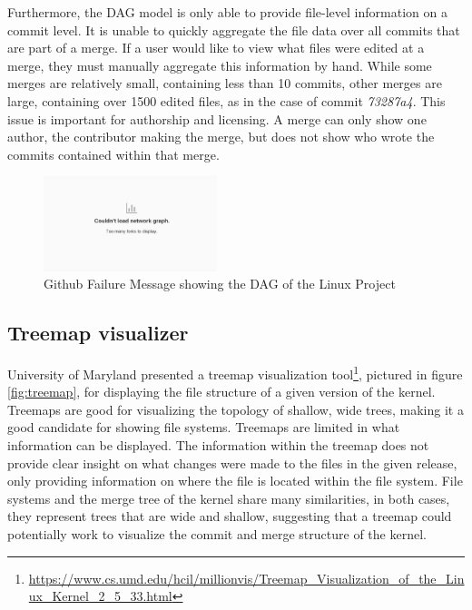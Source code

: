 \documentclass[conference, draftclsnofoot]{IEEEtran}
\begin{document}
Furthermore, the DAG model is only able to provide file-level information on a
commit level. It is unable to quickly aggregate the file data over all commits that
are part of a merge. If a user would like to view what files were edited at a merge,
they must manually aggregate this information by hand. While some merges are
relatively small, containing less than 10 commits, other merges are large,
containing over 1500 edited files, as in the case of commit \textit{73287a4}. This
issue is important for authorship and licensing. A merge can only show one author,
the contributor making the merge, but does not show who wrote the commits contained
within that merge.

\begin{figure}
        \centering
        \includegraphics[width=0.45\textwidth]{figures/github_viewer.png}
        \caption{Github Failure Message showing the DAG of the Linux Project}
        \label{fig:gitfail}
\end{figure}


\subsection{Treemap visualizer}

University of Maryland presented a treemap visualization
tool\footnote{\url{https://www.cs.umd.edu/hcil/millionvis/Treemap_Visualization_of_the_Linux_Kernel_2_5_33.html}},
pictured in figure \ref{fig:treemap}, for
displaying the file structure of a given version of the kernel. Treemaps are good
for visualizing the topology of shallow, wide trees, making it a good candidate for
showing file systems. Treemaps are limited in what information can be displayed. The
information within the treemap does not provide clear insight on what changes were
made to the files in the given release, only providing information on where the file
is located within the file system. File systems and the merge tree of the kernel
share many similarities, in both cases, they represent trees that are wide and
shallow, suggesting that a treemap could potentially work to visualize the commit
and merge structure of the kernel.
\end{document}
